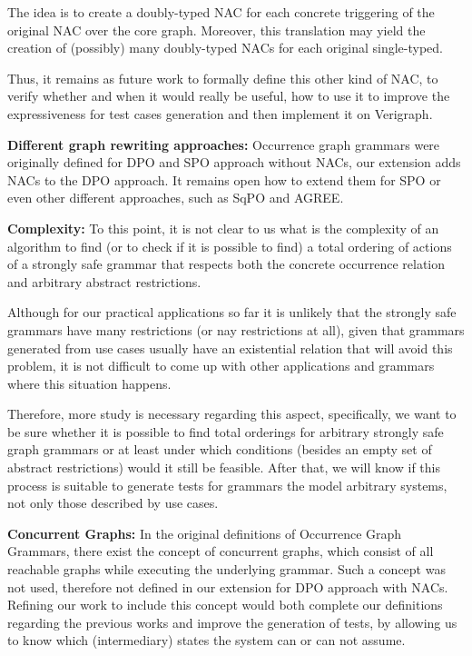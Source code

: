 The idea is to create a doubly-typed NAC for each concrete triggering of the original NAC over the core graph. Moreover, this translation may yield the creation of (possibly) many doubly-typed NACs for each original single-typed. 

Thus, it remains as future work to formally define this other kind of NAC, to verify whether and when it would really be useful, how to use it to improve the expressiveness for test cases generation and then implement it on Verigraph.


\textbf{Different graph rewriting approaches:} Occurrence graph grammars were originally defined for DPO and SPO approach without NACs, our extension adds NACs to the DPO approach. It remains open how to extend them for SPO or even other different approaches, such as SqPO and AGREE.

\textbf{Complexity:} To this point, it is not clear to us what is the complexity of an algorithm to find (or to check if it is possible to find) a total ordering of actions of a strongly safe grammar that respects both the concrete occurrence relation and arbitrary abstract restrictions.

  Although for our practical applications so far it is unlikely that the strongly safe grammars have many restrictions (or nay restrictions at all), given that grammars generated from use cases usually have an existential relation that will avoid this problem, it is not difficult to come up with other applications and grammars where this situation happens.

  Therefore, more study is necessary regarding this aspect, specifically, we want to be sure whether it is possible to find total orderings for arbitrary strongly safe graph grammars or at least under which conditions (besides an empty set of abstract restrictions) would it still be feasible. After that, we will know if this process is suitable to generate tests for grammars the model arbitrary systems, not only those described by use cases.

\textbf{Concurrent Graphs:} In the original definitions of Occurrence Graph Grammars, there exist the concept of concurrent graphs, which consist of all reachable graphs while executing the underlying grammar. Such a concept was not used, therefore not defined in our extension for DPO approach with NACs. Refining our work to include this concept would both complete our definitions regarding the previous works and improve the generation of tests, by allowing us to know which (intermediary) states the system can or can not assume.

